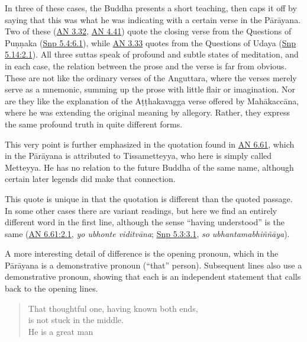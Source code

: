\documentclass[12pt,openany]{book}%
\begin{document}
In three of these cases, the Buddha presents a short teaching, then caps it off by saying that this was what he was indicating with a certain verse in the \textsanskrit{Pārāyana}. Two of these (\href{https://suttacentral.net/an3.32/en/sujato}{AN 3.32}, \href{https://suttacentral.net/an4.41/en/sujato}{AN 4.41}) quote the closing verse from the Questions of \textsanskrit{Puṇṇaka} (\href{https://suttacentral.net/snp5.4/en/sujato\#6.1}{Snp 5.4:6.1}), while \href{https://suttacentral.net/an3.33/en/sujato}{AN 3.33} quotes from the Questions of Udaya (\href{https://suttacentral.net/snp5.14/en/sujato\#2.1}{Snp 5.14:2.1}). All three suttas speak of profound and subtle states of meditation, and in each case, the relation between the prose and the verse is far from obvious. These are not like the ordinary verses of the Anguttara, where the verses merely serve as a mnemonic, summing up the prose with little flair or imagination. Nor are they like the explanation of the \textsanskrit{Aṭṭhakavagga} verse offered by \textsanskrit{Mahākaccāna}, where he was extending the original meaning by allegory. Rather, they express the same profound truth in quite different forms.

This very point is further emphasized in the quotation found in \href{https://suttacentral.net/an6.61/en/sujato}{AN 6.61}, which in the \textsanskrit{Pārāyana} is attributed to Tissametteyya, who here is simply called Metteyya. He has no relation to the future Buddha of the same name, although certain later legends did make that connection.

This quote is unique in that the quotation is different than the quoted passage. In some other cases there are variant readings, but here we find an entirely different word in the first line, although the sense “having understood” is the same (\href{https://suttacentral.net/an6.61/en/sujato\#2.1}{AN 6.61:2.1}, \textit{yo ubhonte \textsanskrit{viditvāna}}; \href{https://suttacentral.net/snp5.3/en/sujato\#3.1}{Snp 5.3:3.1}, \textit{so \textsanskrit{ubhantamabhiññāya}}).

A more interesting detail of difference is the opening pronoun, which in the \textsanskrit{Pārāyana} is a demonstrative pronoun (“that” person). Subsequent lines also use a demonstrative pronoun, showing that each is an independent statement that calls back to the opening lines.

\begin{verse}%
That thoughtful one, having known both ends, \\
is not stuck in the middle. \\
He is a great man

%
\end{verse}
\end{document}
